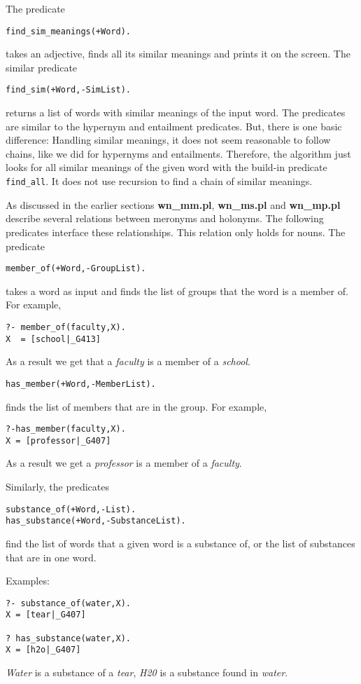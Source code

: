 \documentclass[12pt]{article}
\begin{document}
The predicate
\begin{verbatim}
find_sim_meanings(+Word).
\end{verbatim}
takes an adjective, finds all its similar meanings and prints it on the screen. The similar predicate
\begin{verbatim}
find_sim(+Word,-SimList).
\end{verbatim}
returns a list of words with similar meanings of the input word. The predicates are similar to the hypernym and entailment predicates.
But, there is one basic difference: Handling similar meanings, it does not seem reasonable to follow chains, like we did
for hypernyms and entailments. Therefore, the algorithm just looks for all similar meanings of
the given word with the build-in predicate {\tt find\_all}. It does not use recursion to find a chain of similar meanings.

As discussed in the earlier sections {\bfseries wn\_mm.pl}, {\bfseries wn\_ms.pl} and {\bfseries wn\_mp.pl}
describe several relations
between meronyms and holonyms. The following predicates interface these relationships. This relation only holds
for nouns. The predicate
\begin{verbatim}
member_of(+Word,-GroupList).
\end{verbatim}
takes a word as input and finds the list of groups that the word is a member of. For example,
\begin{verbatim}
?- member_of(faculty,X).
X  = [school|_G413]
\end{verbatim}
As a result we get that a \emph{faculty} is a member of a \emph{school}.
\begin{verbatim}
has_member(+Word,-MemberList).
\end{verbatim}
finds the list of members that are in the group. For example,
\begin{verbatim}
?-has_member(faculty,X).
X = [professor|_G407]
\end{verbatim}
As a result we get a \emph{professor} is a member of a \emph{faculty}.

Similarly, the predicates
\begin{verbatim}
substance_of(+Word,-List).
has_substance(+Word,-SubstanceList).
\end{verbatim}
find the list of words that a given word is a substance of, or the list of substances that are in one word.

Examples:
\begin{verbatim}
?- substance_of(water,X).
X = [tear|_G407]

? has_substance(water,X).
X = [h2o|_G407]
\end{verbatim}
\emph{Water} is a substance of a \emph{tear}, \emph{H20} is a substance found in \emph{water}.
\end{document}
